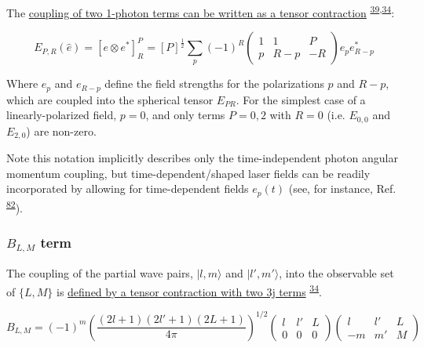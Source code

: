 \documentclass[10pt]{article}
\begin{document}
The
\href{https://epsproc.readthedocs.io/en/latest/methods/geometric_method_dev_260220_090420_tidy.html\#E_\%7BP,R\%7D-tensor}{coupling
of two 1-photon terms can be written as a tensor contraction} \textsuperscript{\hyperref[csl:39]{39},\hyperref[csl:34]{34}}:

\begin{equation}
E_{P,R}(\hat{e})=[e\otimes e^{*}]_{R}^{P}=[P]^{\frac{1}{2}}\sum_{p}(-1)^{R}\left(\begin{array}{ccc}
1 & 1 & P\\
p & R-p & -R
\end{array}\right)e_{p}e_{R-p}^{*}
\label{eq:EPR-defn-1}
\end{equation}

Where \(e_{p}\) and \(e_{R-p}\) define the field strengths for the
polarizations \(p\) and \(R-p\), which are coupled into the spherical
tensor \(E_{PR}\). For the simplest case of a linearly-polarized field, $p=0$, and only terms $P=0,2$ with $R=0$ (i.e. $E_{0,0}$ and $E_{2,0}$) are non-zero.

Note this notation implicitly describes only the time-independent photon angular momentum coupling,
but time-dependent/shaped laser fields can be readily incorporated by allowing for time-dependent fields $e_{p}(t)$ (see, for instance, Ref. \textsuperscript{\hyperref[csl:82]{82}}).

\subsubsection{\texorpdfstring{\(B_{L,M}\)
term}{B\_\{L,M\} term}}\label{b_lm-term}

The coupling of the partial wave pairs, \(|l,m\rangle\) and
\(|l',m'\rangle\), into the observable set of \(\{L,M\}\) is
\href{https://epsproc.readthedocs.io/en/latest/methods/geometric_method_dev_260220_090420_tidy.html\#B_\%7BL,M\%7D-term}{defined
by a tensor contraction with two 3j terms} \textsuperscript{\hyperref[csl:34]{34}}.

\begin{equation}
B_{L,M}=(-1)^{m}\left(\frac{(2l+1)(2l'+1)(2L+1)}{4\pi}\right)^{1/2}\left(\begin{array}{ccc}
l & l' & L\\
0 & 0 & 0
\end{array}\right)\left(\begin{array}{ccc}
l & l' & L\\
-m & m' & M
\end{array}\right)
\label{eq:BLM-func-defn}
\end{equation}
\end{document}
